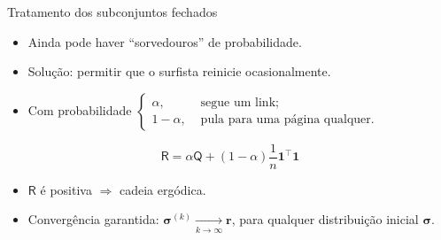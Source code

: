 \documentclass[aspectratio=169]{beamer}
\begin{document}
\begin{frame}{Tratamento dos subconjuntos fechados}
\begin{itemize}\itemsep=.5cm
  \item Ainda pode haver “sorvedouros” de probabilidade.
  \item Solução: permitir que o surfista reinicie ocasionalmente.
  \item Com probabilidade $
    \begin{cases}
      \alpha, &\text{ segue um link;}\\
      1-\alpha, &\text{ pula para uma página qualquer.}
    \end{cases}$
\end{itemize}
\[
\boxed{
  \mathsf{R} = \alpha\mathsf{Q} + (1-\alpha)\frac{1}{n}\mathbf{1}^\intercal\mathbf{1}
}
\]
\begin{itemize}
  \item $\mathsf{R}$ é positiva $\Rightarrow$ cadeia ergódica.
  \item Convergência garantida:
    $\bm{\sigma}^{(k)} \xrightarrow[k\to\infty]{} \mathbf{r}$, para
    qualquer distribuição inicial $\bm{\sigma}$.
\end{itemize}
\end{frame}
\end{document}
